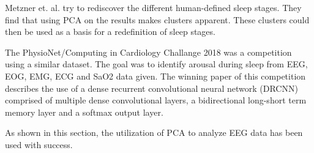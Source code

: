 Metzner et. al.\cite{Metzner2023} try to rediscover the different human-defined sleep stages. They find that using PCA on the results makes clusters apparent. These clusters could then be used as a basis for a redefinition of sleep stages.

The PhysioNet/Computing in Cardiology Challange 2018\cite{Ghassemi2018} was a competition using a similar dataset. The goal was to identify arousal during sleep from EEG, EOG, EMG, ECG and SaO2 data given. The winning paper\cite{Howe2018} of this competition describes the use of a dense recurrent convolutional neural network (DRCNN) comprised of multiple dense convolutional layers, a bidirectional long-short term memory layer and a softmax output layer.


As shown in this section, the utilization of PCA to analyze EEG data has been used with success.
